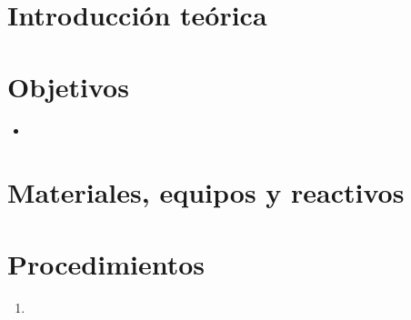 \SetPractica{}{}

\section{Introducción teórica}



\section{Objetivos}

\begin{itemize}
    \item 
\end{itemize}

\section{Materiales, equipos y reactivos}

\begin{table}[H]
\end{table}

\section{Procedimientos}

\begin{enumerate}
    \item 
\end{enumerate}
